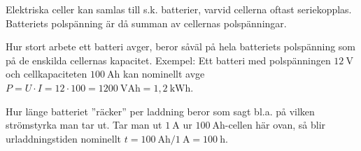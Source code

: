 Elektriska celler kan samlas till s.k. batterier, varvid cellerna oftast
seriekopplas.
Batteriets polspänning är då summan av cellernas polspänningar.

Hur stort arbete ett batteri avger, beror såväl på hela batteriets
polspänning som på de enskilda cellernas kapacitet.
Exempel:
Ett batteri med polspänningen \(12\ \mathrm{V}\) och cellkapaciteten
\(100\ \mathrm{Ah}\) kan nominellt avge
\(P = U \cdot I = 12 \cdot 100 = 1200\ \mathrm{VAh} = 1,2\ \mathrm{kWh}\).

Hur länge batteriet ''räcker'' per laddning beror som sagt bl.a. på vilken
strömstyrka man tar ut.
Tar man ut \(1\ \mathrm{A}\) ur \(100\ \mathrm{Ah}\)-cellen här ovan, så blir
urladdningstiden nominellt
\(t = 100\ \mathrm{Ah}/1\ \mathrm{A} = 100\ \mathrm{h}\).
